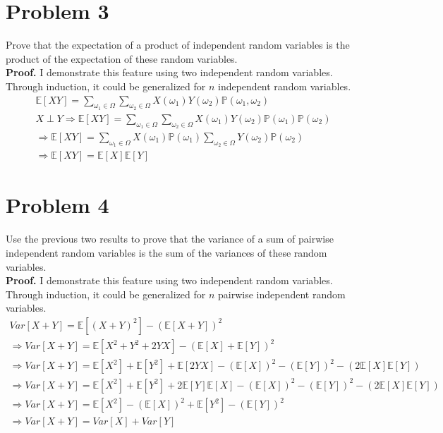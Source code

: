 \documentclass[11pt]{article} %
\begin{document}
\section*{Problem 3}
 Prove that the expectation of a product of independent random variables is the product of the expectation of these random variables.\\
\textbf{Proof.} I demonstrate this feature using two independent random variables. Through induction, it could be generalized for $n$ independent random variables.
\begin{gather}
\mathbb{E}[XY] = \sum_{\omega_1 \in \Omega} \sum_{\omega_2 \in \Omega} X(\omega_1)Y(\omega_2)\mathbb{P}(\omega_1,\omega_2) \\
X \perp Y \Rightarrow \mathbb{E}[XY] = \sum_{\omega_1 \in \Omega} \sum_{\omega_2 \in \Omega} X(\omega_1)Y(\omega_2)\mathbb{P}(\omega_1)\mathbb{P}(\omega_2) \\
\Rightarrow \mathbb{E}[XY] = \sum_{\omega_1 \in \Omega} X(\omega_1)\mathbb{P}(\omega_1)\sum_{\omega_2 \in \Omega} Y(\omega_2)\mathbb{P}(\omega_2) \\
\Rightarrow \mathbb{E}[XY] = \mathbb{E}[X]\mathbb{E}[Y]
\end{gather}

\section*{Problem 4}
Use the previous two results to prove that the variance of a sum of pairwise independent random variables is the sum of the variances of these random variables.\\
\textbf{Proof.} I demonstrate this feature using two independent random variables. Through induction, it could be generalized for $n$ pairwise independent random variables.
\begin{gather}
Var[X+Y] = \mathbb{E}[(X+Y)^2] - (\mathbb{E}[X+Y])^2\\
\Rightarrow Var[X+Y] = \mathbb{E}[X^2+Y^2+2YX] - (\mathbb{E}[X]+\mathbb{E}[Y])^2\\
\Rightarrow Var[X+Y] = \mathbb{E}[X^2]+\mathbb{E}[Y^2]+\mathbb{E}[2YX] - (\mathbb{E}[X])^2-(\mathbb{E}[Y])^2-(2\mathbb{E}[X]\mathbb{E}[Y])\\
\Rightarrow Var[X+Y] = \mathbb{E}[X^2]+\mathbb{E}[Y^2]+2\mathbb{E}[Y]\mathbb{E}[X] - (\mathbb{E}[X])^2-(\mathbb{E}[Y])^2-(2\mathbb{E}[X]\mathbb{E}[Y])\\
\Rightarrow Var[X+Y] = \mathbb{E}[X^2]- (\mathbb{E}[X])^2+\mathbb{E}[Y^2]-(\mathbb{E}[Y])^2\\
\Rightarrow Var[X+Y] = Var[X]+Var[Y]
\end{gather}
\end{document}
